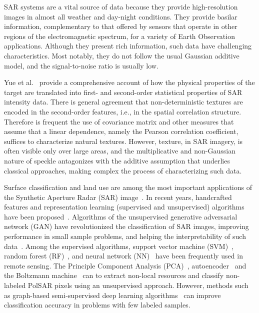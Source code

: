 \documentclass[journal]{IEEEtran}
\begin{document}
	SAR systems are a vital source of data because they provide high-resolution images in almost all weather and day-night conditions.
	They provide basilar information, complementary to that offered by sensors that operate in other regions of the electromagnetic spectrum, for a variety of Earth Observation applications.	
	Although they present rich information, such data have challenging characteristics.
	Most notably, they do not follow the usual Gaussian additive model, and the signal-to-noise ratio is usually low.
	
	Yue et al.~\cite{Yue2020Gaussian} provide a comprehensive account of how the physical properties of the target are translated into first- and second-order statistical properties of SAR intensity data.
	There is general agreement that non-deterministic textures are encoded in the second-order features, i.e., in the spatial correlation structure.
	Therefore is frequent the use of covariance matrix and other measures that assume that a linear dependence, namely the Pearson correlation coefficient, suffices to characterize natural textures.
	However, texture, in SAR imagery, is often visible only over large areas, and the multiplicative and non-Gaussian nature of speckle antagonizes with the additive assumption that underlies classical approaches, making complex the process of characterizing such data.
	
	Surface classification and land use are among the most important applications of the Synthetic Aperture Radar (SAR) image~\cite{Pottier2004Unsupervised}.
    In recent years, handcrafted features and representation learning (supervised and unsupervised) algorithms have been proposed~\cite{han2020unsupervised, huang2020classification, xie2020polsar}.
    Algorithms of the unsupervised generative adversarial network (GAN) have revolutionized the classification of SAR images, improving performance in small sample problems, and helping the interpretability of such data~\cite{liu2019task}.
    Among the supervised algorithms, support vector machine (SVM)~\cite{sukawattanavijit2017ga}, random forest (RF)~\cite{mcnairn2014early}, and neural network (NN)~\cite{lin2017deep} have been frequently used in remote sensing.
    The Principle Component Analysis (PCA)~\cite{ressel2015neural}, autoencoder~\cite{wang2019classification} and the Boltzmann machine~\cite{qin2017object} can to extract non-local resources and classify non-labeled PolSAR pixels using an unsupervised approach.
    However, methods such as graph-based semi-supervised deep learning algorithms~\cite{bi2018graph} can improve classification accuracy in problems with few labeled samples.
\end{document}
